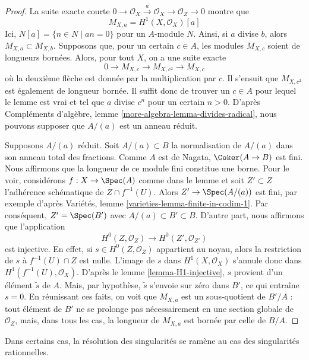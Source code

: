 \begin{proof} La suite exacte courte $
0 \to \mathcal{O}_X \xrightarrow{a} \mathcal{O}_X \to \mathcal{O}_Z \to 0
$ montre que \begin{equation}
\label{equation-a-torsion}
M_{X, a} = H^1(X, \mathcal{O}_X)[a]
\end{equation} Ici, $N[a] = \{n \in N \mid an = 0\}$ pour un $A$-module $N$. Ainsi, si $a$ divise $b$, alors $M_{X, a} \subset M_{X, b}$. Supposons que, pour un certain $c \in A$, les modules $M_{X, c}$ soient de longueurs bornées. Alors, pour tout $X$, on a une suite exacte $$
0 \to M_{X, c} \to M_{X, c^2} \to M_{X, c}
$$ où la deuxième flèche est donnée par la multiplication par $c$. Il s'ensuit que $M_{X, c^2}$ est également de longueur bornée. Il suffit donc de trouver un $c \in A$ pour lequel le lemme est vrai et tel que $a$ divise $c^n$ pour un certain $n > 0$. D'après Compléments d'algèbre, lemme \ref{more-algebra-lemma-divides-radical}, nous pouvons supposer que $A/(a)$ est un anneau réduit.

\medskip\noindent Supposons $A/(a)$ réduit. Soit $A/(a) \subset B$ la normalisation de $A/(a)$ dans son anneau total des fractions. Comme $A$ est de Nagata, $\Coker(A \to B)$ est fini. Nous affirmons que la longueur de ce module fini constitue une borne. Pour le voir, considérons $f : X \to \Spec(A)$ comme dans le lemme et soit $Z' \subset Z$ l'adhérence schématique de $Z \cap f^{-1}(U)$. Alors $Z' \to \Spec(A/(a))$ est fini, par exemple d'après Variétés, lemme \ref{varieties-lemma-finite-in-codim-1}. Par conséquent, $Z' = \Spec(B')$ avec $A/(a) \subset B' \subset B$. D'autre part, nous affirmons que l'application $$
H^0(Z, \mathcal{O}_Z) \to H^0(Z', \mathcal{O}_{Z'})
$$ est injective. En effet, si $s \in H^0(Z, \mathcal{O}_Z)$ appartient au noyau, alors la restriction de $s$ à $f^{-1}(U) \cap Z$ est nulle. L'image de $s$ dans $H^1(X, \mathcal{O}_X)$ s'annule donc dans $H^1(f^{-1}(U), \mathcal{O}_X)$. D'après le lemme \ref{lemma-H1-injective}, $s$ provient d'un élément $\tilde s$ de $A$. Mais, par hypothèse, $\tilde s$ s'envoie sur zéro dans $B'$, ce qui entraîne $s = 0$. En réunissant ces faits, on voit que $M_{X, a}$ est un sous-quotient de $B'/A$ : tout élément de $B'$ ne se prolonge pas nécessairement en une section globale de $\mathcal{O}_Z$, mais, dans tous les cas, la longueur de $M_{X, a}$ est bornée par celle de $B/A$. \end{proof}

\noindent Dans certains cas, la résolution des singularités se ramène au cas des singularités rationnelles.

